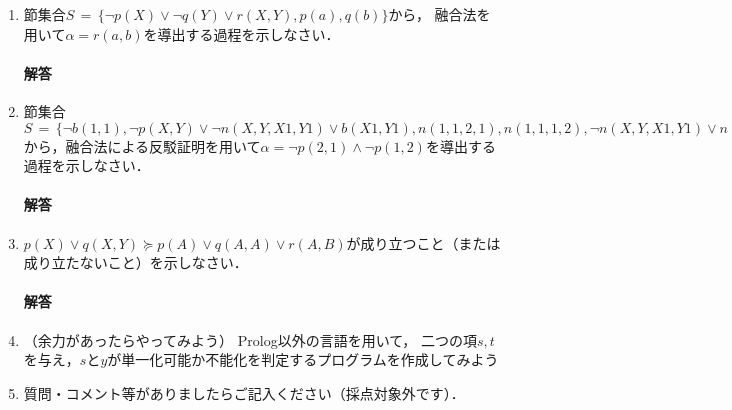 \documentclass[dvipdfmx]{jsarticle}
\begin{document}
\begin{enumerate}
  \paragraph{解答}
  \begin{enumerate}
    \item
    \item
    \item
    \item
    \item item
  \end{enumerate}


\item
  節集合$S\,=\,\{  \neg p(X)\lor \neg q(Y)\lor r(X,Y), p(a), q(b)  \}$から，
  融合法を用いて$\alpha=r(a,b)$を導出する過程を示しなさい．
  \paragraph{解答}


\item 節集合
  $S\,=\,\{
  \neg b(1,1), \neg p(X,Y)\lor \neg n(X,Y,X1,Y1)\lor b(X1,Y1),
  n(1,1,2,1), n(1,1,1,2), \neg n(X,Y,X1,Y1)\lor n(X1,Y1,X,Y), n(X,Y,X1,Y1)\lor \neg n(X1,Y1,X,Y)
  \}$
  から，融合法による反駁証明を用いて$\alpha=\neg p(2,1)\land \neg p(1,2)$を導出する過程を示しなさい．
  \paragraph{解答}



\item $p(X) \lor q(X,Y)\succeq p(A) \lor q(A,A) \lor r(A,B)$が成り立つこと（または成り立たないこと）を示しなさい．
\paragraph{解答}


\item （余力があったらやってみよう）
  Prolog以外の言語を用いて，
  二つの項$s,t$を与え，$s$と$y$が単一化可能か不能化を判定するプログラムを作成してみよう

\item 質問・コメント等がありましたらご記入ください（採点対象外です）．
\end{enumerate}
\end{document}
